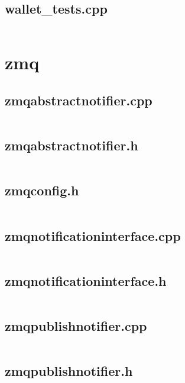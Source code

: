 \documentclass{article}
\begin{document}
\subsection{wallet\_tests.cpp}
\inputminted{cpp}{/home/dufferzafar/dev/@clones/bitcoin/src/wallet/test/wallet_tests.cpp}
\newpage

\section{zmq}

\subsection{zmqabstractnotifier.cpp}
\inputminted{cpp}{/home/dufferzafar/dev/@clones/bitcoin/src/zmq/zmqabstractnotifier.cpp}
\newpage

\subsection{zmqabstractnotifier.h}
\inputminted{cpp}{/home/dufferzafar/dev/@clones/bitcoin/src/zmq/zmqabstractnotifier.h}
\newpage

\subsection{zmqconfig.h}
\inputminted{cpp}{/home/dufferzafar/dev/@clones/bitcoin/src/zmq/zmqconfig.h}
\newpage

\subsection{zmqnotificationinterface.cpp}
\inputminted{cpp}{/home/dufferzafar/dev/@clones/bitcoin/src/zmq/zmqnotificationinterface.cpp}
\newpage

\subsection{zmqnotificationinterface.h}
\inputminted{cpp}{/home/dufferzafar/dev/@clones/bitcoin/src/zmq/zmqnotificationinterface.h}
\newpage

\subsection{zmqpublishnotifier.cpp}
\inputminted{cpp}{/home/dufferzafar/dev/@clones/bitcoin/src/zmq/zmqpublishnotifier.cpp}
\newpage

\subsection{zmqpublishnotifier.h}
\inputminted{cpp}{/home/dufferzafar/dev/@clones/bitcoin/src/zmq/zmqpublishnotifier.h}
\newpage


\end{document}
